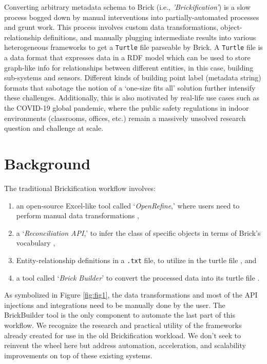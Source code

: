 \documentclass[twocolumn, switch]{article} %
\begin{document}
Converting arbitrary metadata schema to Brick (i.e., \emph{'Brickification'}) is a
slow process bogged down by manual interventions into partially-automated
processes and grunt work. This process involves custom data transformations,
object-relationship definitions, and manually plugging intermediate results
into various heterogeneous frameworks to get a \texttt{Turtle} file parseable by Brick.
A \texttt{Turtle} file is a data format that expresses data in a RDF model which can be used to store graph-like info for
relationships between different entities, in this case, building sub-systems and
sensors. Different kinds of building point label (metadata string) formats that sabotage the notion of a ‘one-size fits all’ solution further intensify these challenges.  Additionally, this is also motivated by real-life use cases such as the COVID-19 global pandemic, where the public safety regulations in indoor environments (classrooms, offices, etc.) remain a massively unsolved research question and challenge at scale.


\section{Background}

The traditional Brickification workflow involves:
\begin{enumerate}
    \item an open-source Excel-like tool called ‘\emph{OpenRefine},’ where users need
        to perform manual data transformations
        \cite{gtfierro225_2020},
    \item a ‘\emph{Reconciliation API},’ to infer the class of specific objects in
        terms of Brick’s vocabulary \cite{brickschema},
    \item Entity-relationship definitions in a \texttt{.txt} file, to utilize in the
        turtle file \cite{gtfierro}, and
    \item a tool called ‘\emph{Brick Builder}’ to convert the processed data into its
        turtle file \cite{brick_ttl_viewer}.
\end{enumerate}
As symbolized in Figure \ref{fig:fig1}, the data transformations and most of the API injections and integrations need to be manually done by the user. The BrickBuilder tool is the only component to automate the last part of this workflow. We recognize the research and practical utility of the frameworks already created for use in the old Brickification workload. We don’t seek to reinvent the wheel here but address automation, acceleration, and scalability improvements on top of these existing systems.
\end{document}
